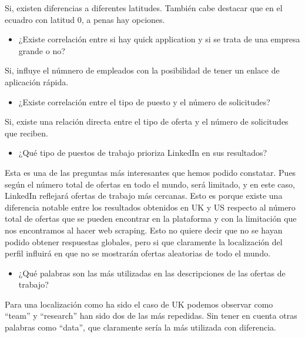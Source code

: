 \documentclass[
]{article}
\providecommand{\tightlist}{%
  \setlength{\itemsep}{0pt}\setlength{\parskip}{0pt}}
\begin{document}
Si, existen diferencias a diferentes latitudes. También cabe destacar
que en el ecuadro con latitud 0, a penas hay opciones.

\begin{itemize}
\tightlist
\item
  ¿Existe correlación entre si hay quick application y si se trata de
  una empresa grande o no?
\end{itemize}

Si, influye el númnero de empleados con la posibilidad de tener un
enlace de aplicación rápida.

\begin{itemize}
\tightlist
\item
  ¿Existe correlación entre el tipo de puesto y el número de
  solicitudes?
\end{itemize}

Si, existe una relación directa entre el tipo de oferta y el número de
solicitudes que reciben.

\begin{itemize}
\tightlist
\item
  ¿Qué tipo de puestos de trabajo prioriza LinkedIn en sus resultados?
\end{itemize}

Esta es una de las preguntas más interesantes que hemos podido
constatar. Pues según el número total de ofertas en todo el mundo, será
limitado, y en este caso, LinkedIn reflejará ofertas de trabajo más
cercanas. Esto es porque existe una diferencia notable entre los
resultados obtenidos en UK y US respecto al número total de ofertas que
se pueden encontrar en la plataforma y con la limitación que nos
encontramos al hacer web scraping. Esto no quiere decir que no se hayan
podido obtener respuestas globales, pero si que claramente la
localización del perfil influirá en que no se mostrarán ofertas
aleatorias de todo el mundo.

\begin{itemize}
\tightlist
\item
  ¿Qué palabras son las más utilizadas en las descripciones de las
  ofertas de trabajo?
\end{itemize}

Para una localización como ha sido el caso de UK podemos observar como
``team'' y ``research'' han sido dos de las más repedidas. Sin tener en
cuenta otras palabras como ``data'', que claramente sería la más
utilizada con diferencia.
\end{document}
